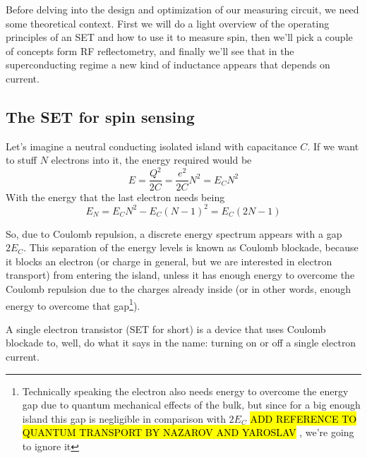 \documentclass[../main.tex]{subfiles}
\begin{document}
Before delving into the design and optimization of our measuring circuit,
we need some theoretical context. First we will do a light overview of the
operating principles of an SET and how to use it to measure spin, then we'll
pick a couple of concepts form RF reflectometry, and finally we'll see that
in the superconducting regime a new kind of inductance appears that depends on
current.

\subsection{The SET for spin sensing}
Let's imagine a neutral conducting isolated island with capacitance \(C\).
If we want to stuff \(N\) electrons into it, the energy required would be
\begin{equation*}
\label{eq:EnergyIsland}
    E = \frac{Q^2}{2C} = \frac{e^2}{2C}N^2 = E_{C}N^2
\end{equation*}
With the energy that the last electron needs being
\begin{equation*}
\label{eq:NthEnergyIsland}
    E_{N} = E_{C}N^2 - E_{C}(N-1)^2 = E_{C}(2N - 1)
\end{equation*}

So, due to Coulomb repulsion, a discrete energy spectrum appears with
a gap \(2E_{C}\). This separation of the energy levels is known as Coulomb
blockade, because it blocks an electron (or charge in general, but we are
interested in electron transport) from entering the island, unless it has
enough energy to overcome the Coulomb repulsion due to the charges already
inside (or in other words, enough energy to overcome that
gap\footnote{Technically speaking the electron also needs energy to overcome
the energy gap due to quantum mechanical effects of the bulk, but since for a
big enough island this gap is negligible in comparison with \(2E_{C}\)
\hl{ADD REFERENCE TO QUANTUM TRANSPORT BY NAZAROV AND YAROSLAV}
, we're going to ignore it
}).

A single electron transistor (SET for short) is a device that uses Coulomb
blockade to, well, do what it says in the name: turning on or off a single
electron current.
\end{document}
